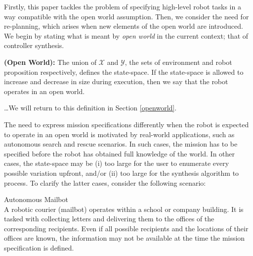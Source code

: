 Firstly, this paper tackles the problem of specifying high-level robot tasks in a way compatible with the open world assumption. Then, we consider the need for re-planning, which arises when new elements of the open world are introduced. We begin by stating what is meant by \emph{open world} in the current context; that of controller synthesis.

\begin{myDefinition}
	\textbf{(Open World):} The union of $\mathcal{X}$ and $\mathcal{Y}$, the sets of environment and robot proposition respectively, defines the state-space. If the state-space is allowed to increase and decrease in size during execution, then we say that the robot operates in an open world.
\end{myDefinition}
\ldots We will return to this definition in Section \ref{openworld}.

The need to express mission specifications differently when the robot is expected to operate in an open world is motivated by real-world applications, such as autonomous search and rescue scenarios. In such cases, the mission has to be specified before the robot has obtained full knowledge of the world. In other cases, the state-space may be (i) too large for the user to enumerate every possible variation upfront, and/or (ii) too large for the synthesis algorithm to process. To clarify the latter cases, consider the following scenario:

\begin{myExample}\label{Ex:mailbot1} Autonomous Mailbot\\
	A robotic courier (mailbot) operates within a school or company building. It is tasked with collecting letters and delivering them to the offices of the corresponding recipients. Even if all possible recipients and the locations of their offices are known, the information may not be available at the time the mission specification is defined. 
\end{myExample}

